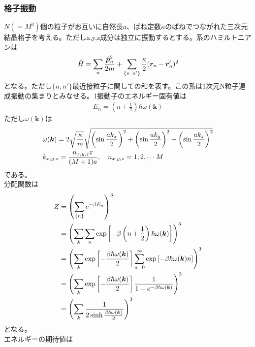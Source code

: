 \documentclass{jsarticle}  %
\numberwithin{equation}{section} %
\numberwithin{figure}{section}
\begin{document}
\subsubsection{格子振動}
    $N(=M^3)$個の粒子がお互いに自然長$a$、ばね定数$\kappa$のばねでつながれた三次元結晶格子を考える。ただしx,y,z成分は独立に振動するとする。系のハミルトニアンは
    \begin{align}
        \hat{H} = \sum_n \frac{\hat{\bm{p}}_n^2}{2m} + \sum_{\{ n\ n' \}} \frac{\kappa}{2} (\bm{r}_n -\bm{r}_n')^2 \notag 
    \end{align}
    となる。ただし$\{ n,n' \}$最近接粒子に関しての和を表す。この系は1次元N粒子連成振動の集まりとみなせる。1振動子のエネルギー固有値は
    \begin{align}
        E_n = \left( n + \frac{1}{2} \right)\hbar \omega(\bm{k})
    \end{align}
    ただし$\omega (\bm{k})$は
    \begin{align}
        &\omega (\bm{k}) = 2 \sqrt{\frac{\kappa}{m}} \sqrt{\left( \sin \frac{ak_x}{2} \right)^2 + \left( \sin \frac{ak_y}{2} \right)^2 + \left( \sin \frac{ak_z}{2} \right)^2} \\
        &k_{x,y,z} = \frac{n_{x,y,z}\pi}{(M+1)a},\quad n_{x,y,z} = 1,2,\cdots M \notag 
    \end{align}
    である。\\
    分配関数は
    \begin{align}
        Z &= \left( \sum_{\{n\}} e^{-\beta E_n} \right)^{3} \notag \\
        &= \left( \sum_{\bm{k}}\sum_n \exp\left[ {-\beta \left( n + \frac{1}{2} \right)\hbar \omega(\bm{k})} \right] \right)^{3} \notag \\
        &= \left( \sum_{\bm{k}} \exp\left[ -\frac{\beta \hbar \omega(\bm{k})}{2} \right]  \sum_{n=0}^{\infty} \exp\left[ {-\beta \hbar \omega(\bm{k})} n\right] \right)^{3} \notag \\
        &= \left( \sum_{\bm{k}} \exp\left[ -\frac{\beta \hbar \omega(\bm{k})}{2} \right]  \frac{1}{1 - e^{-\beta \hbar \omega (\bm{k})}}\right)^{3} \notag \\
        &= \left( \sum_{\bm{k}} \frac{1}{2 \sinh \frac{\beta \hbar \omega (\bm{k})}{2}}\right)^{3} 
    \end{align}
    となる。\\
    エネルギーの期待値は
\end{document}
